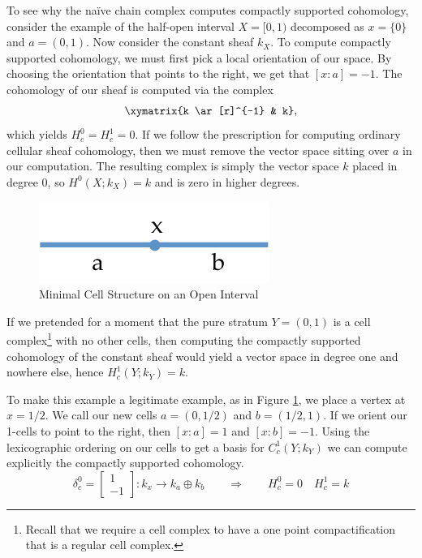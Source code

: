 \begin{ex}
To see why the na\"ive chain complex computes compactly supported cohomology, consider the example of the half-open interval $X=[0,1)$ decomposed as $x=\{0\}$ and $a=(0,1)$. Now consider the constant sheaf $k_X$. To compute compactly supported cohomology, we must first pick a local orientation of our space. By choosing the orientation that points to the right, we get that $[x:a]=-1$. The cohomology of our sheaf is computed via the complex
\[
  \xymatrix{k \ar[r]^{-1} & k},
\]
which yields $H^0_c=H^1_c=0$. If we follow the prescription for computing ordinary cellular sheaf cohomology, then we must remove the vector space sitting over $a$ in our computation. The resulting complex is simply the vector space $k$ placed in degree 0, so $H^0(X;k_X)=k$ and is zero in higher degrees.
\end{ex}

\begin{figure}[ht]
\centering
\includegraphics[width=.3\textwidth]{open_interval_p.pdf}
\caption{Minimal Cell Structure on an Open Interval}
\label{fig:open_interval}
\end{figure}

\begin{ex}
 If we pretended for a moment that the pure stratum $Y=(0,1)$ is a cell complex\footnote{Recall that we require a cell complex to have a one point compactification that is a regular cell complex.} with no other cells, then computing the compactly supported cohomology of the constant sheaf would yield a vector space in degree one and nowhere else, hence $H^1_c(Y;k_Y)=k$.

 To make this example a legitimate example, as in Figure \ref{fig:open_interval}, we place a vertex at $x=1/2$. We call our new cells $a=(0,1/2)$ and $b=(1/2,1)$. If we orient our 1-cells to point to the right, then $[x:a]=1$ and $[x:b]=-1$. Using the lexicographic ordering on our cells to get a basis for $C^1_c(Y;k_Y)$ we can compute explicitly the compactly supported cohomology.
 \[
  \delta^0_c=\begin{bmatrix}1 \\ -1\end{bmatrix} : k_x \to k_a\oplus k_b \qquad \Rightarrow \qquad H^0_c=0 \quad H^1_c=k
 \]
\end{ex}

